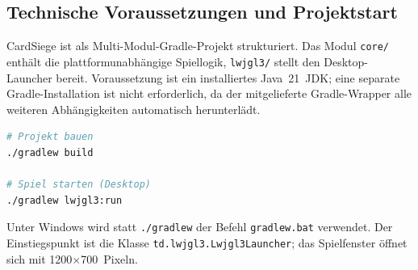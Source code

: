 \subsection{Technische Voraussetzungen und Projektstart}

CardSiege ist als Multi-Modul-Gradle-Projekt strukturiert. Das Modul
\texttt{core/} enthält die plattformunabhängige Spiellogik, \texttt{lwjgl3/}
stellt den Desktop-Launcher bereit. Voraussetzung ist ein installiertes
Java~21~JDK; eine separate Gradle-Installation ist nicht erforderlich, da der
mitgelieferte Gradle-Wrapper alle weiteren Abhängigkeiten automatisch
herunterlädt.

\begin{lstlisting}[language=bash,caption={Build und Start \"{u}ber den Gradle-Wrapper},label=lst:build]
# Projekt bauen
./gradlew build

# Spiel starten (Desktop)
./gradlew lwjgl3:run
\end{lstlisting}

Unter Windows wird statt \texttt{./gradlew} der Befehl \texttt{gradlew.bat}
verwendet. Der Einstiegspunkt ist die Klasse
\texttt{td.lwjgl3.Lwjgl3Launcher}; das Spielfenster öffnet sich mit
1200$\times$700~Pixeln.